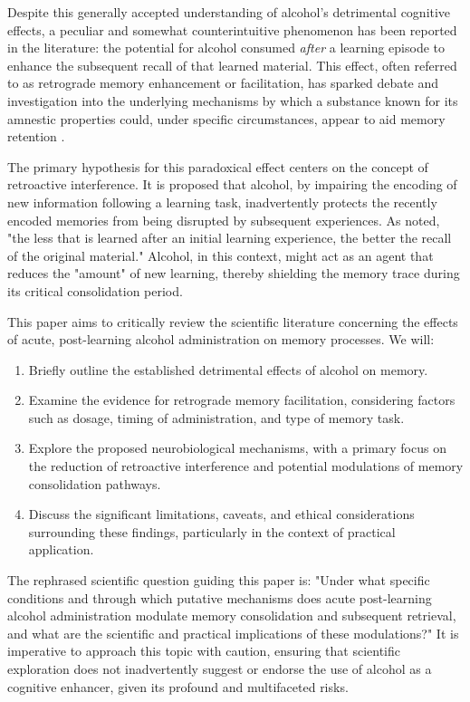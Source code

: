 \documentclass[12pt, a4paper]{article}
\begin{document}
Despite this generally accepted understanding of alcohol's detrimental cognitive effects, a peculiar and somewhat counterintuitive phenomenon has been reported in the literature: the potential for alcohol consumed \textit{after} a learning episode to enhance the subsequent recall of that learned material. This effect, often referred to as retrograde memory enhancement or facilitation, has sparked debate and investigation into the underlying mechanisms by which a substance known for its amnestic properties could, under specific circumstances, appear to aid memory retention \cite{Parker1980, Lamberty1990}.

The primary hypothesis for this paradoxical effect centers on the concept of retroactive interference. It is proposed that alcohol, by impairing the encoding of new information following a learning task, inadvertently protects the recently encoded memories from being disrupted by subsequent experiences. As \cite{Weingartner1978} noted, "the less that is learned after an initial learning experience, the better the recall of the original material." Alcohol, in this context, might act as an agent that reduces the "amount" of new learning, thereby shielding the memory trace during its critical consolidation period.

This paper aims to critically review the scientific literature concerning the effects of acute, post-learning alcohol administration on memory processes. We will:
\begin{enumerate}
    \item Briefly outline the established detrimental effects of alcohol on memory.
    \item Examine the evidence for retrograde memory facilitation, considering factors such as dosage, timing of administration, and type of memory task.
    \item Explore the proposed neurobiological mechanisms, with a primary focus on the reduction of retroactive interference and potential modulations of memory consolidation pathways.
    \item Discuss the significant limitations, caveats, and ethical considerations surrounding these findings, particularly in the context of practical application.
\end{enumerate}
The rephrased scientific question guiding this paper is: "Under what specific conditions and through which putative mechanisms does acute post-learning alcohol administration modulate memory consolidation and subsequent retrieval, and what are the scientific and practical implications of these modulations?" It is imperative to approach this topic with caution, ensuring that scientific exploration does not inadvertently suggest or endorse the use of alcohol as a cognitive enhancer, given its profound and multifaceted risks.
\end{document}
